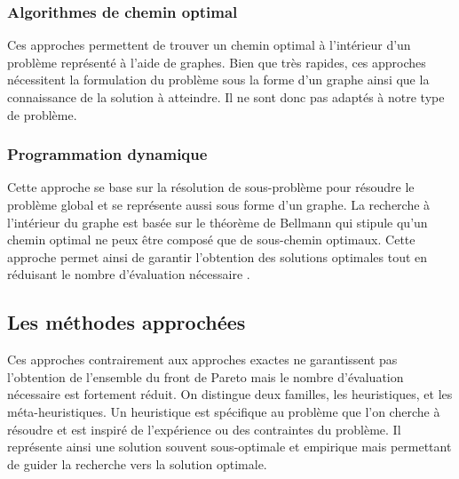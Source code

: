 \subsubsection{Algorithmes de chemin optimal} %
\label{ssub:algorithmes_de_chemin_optimal}
Ces approches permettent de trouver un chemin optimal à l’intérieur d’un problème
représenté à l’aide de graphes. Bien que très rapides, ces approches nécessitent
la formulation du problème sous la forme d’un graphe ainsi que la connaissance de
la solution à atteindre. Il ne sont donc pas adaptés à notre type de problème.


\subsubsection{Programmation dynamique} %
\label{ssub:programmation_dynamique}
Cette approche se base sur la résolution de sous-problème pour résoudre le problème global
et se représente aussi sous forme d’un graphe. La recherche à l’intérieur du graphe est basée sur le théorème
de Bellmann qui stipule qu’un chemin optimal ne peux être composé que de sous-chemin
optimaux. Cette approche permet ainsi de garantir l’obtention des solutions
optimales tout en réduisant le nombre d’évaluation nécessaire \parencite{Rivallain2013}.




\subsection{Les méthodes approchées} %
\label{sub:les_methodes_approchees}
Ces approches contrairement aux approches exactes ne garantissent pas l’obtention
de l’ensemble du front de Pareto mais le nombre d’évaluation nécessaire est fortement
réduit. On distingue deux familles, les heuristiques, et les méta-heuristiques.
Un heuristique est spécifique au problème que l’on cherche à résoudre et est
inspiré de l’expérience ou des contraintes du problème. Il représente ainsi une
solution souvent sous-optimale et empirique mais permettant de guider la recherche
vers la solution optimale.


